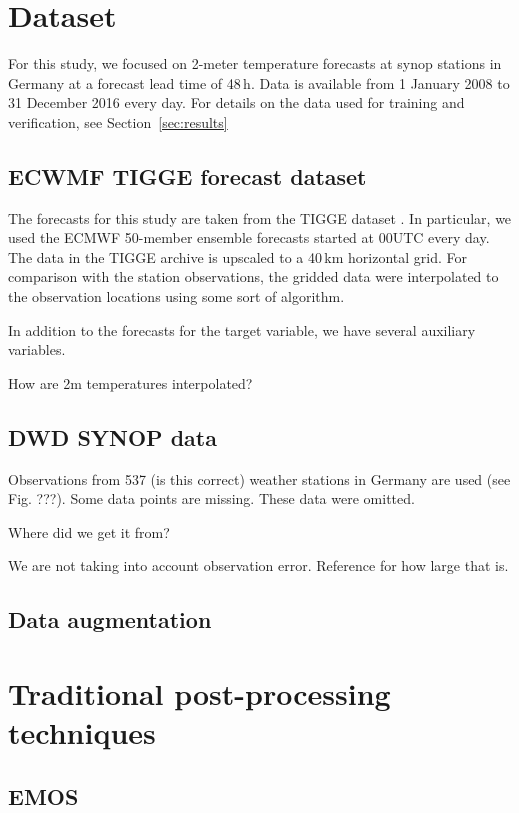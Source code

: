 \documentclass[a4paper,10pt]{scrartcl}
\begin{document}
\section{Dataset}

For this study, we focused on 2-meter temperature forecasts at synop stations in Germany at a forecast lead time of 48\,h. Data is available from 1 January 2008 to 31 December 2016 every day. For details on the data used for training and verification, see Section~\ref{sec:results}

\subsection{ECWMF TIGGE forecast dataset}
The forecasts for this study are taken from the TIGGE dataset \citep{Bougeault2010}. In particular, we used the ECMWF 50-member ensemble forecasts started at 00UTC every day. The data in the TIGGE archive is upscaled to a 40\,km horizontal grid. For comparison with the station observations, the gridded data were interpolated to the observation locations using some sort of algorithm. 

In addition to the forecasts for the target variable, we have several auxiliary variables.

How are 2m temperatures interpolated?

\subsection{DWD SYNOP data}
Observations from 537 (is this correct) weather stations in Germany are used (see Fig. ???). Some data points are missing. These data were omitted.

Where did we get it from?

We are not taking into account observation error. Reference for how large that is.

\subsection{Data augmentation}

\section{Traditional post-processing techniques}

\subsection{EMOS}
\end{document}
